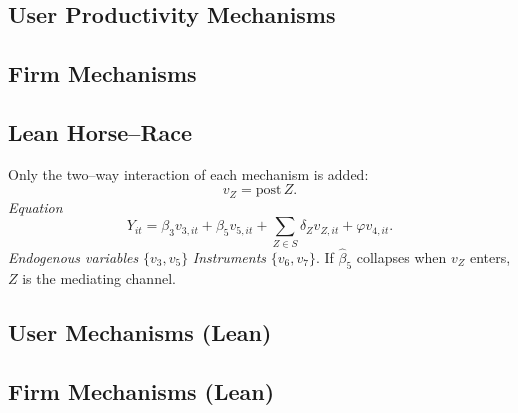 \documentclass{article}
\newcommand{\cleanedresultsdir}{../results/cleaned}
\begin{document}
\clearpage
\begin{landscape}
\subsection{User Productivity Mechanisms}

\end{landscape}

\clearpage
\begin{landscape}
\subsection{Firm Mechanisms}

\end{landscape}


\clearpage
\begin{landscape}
\subsection*{Lean Horse–Race}
Only the two–way interaction of each mechanism is added:
\[v_Z=\text{post}\,Z.\]
\emph{Equation}
\[Y_{it}=\beta_3 v_{3,it}+\beta_5 v_{5,it}+\sum_{Z\in S}\delta_Z v_{Z,it}+\varphi v_{4,it}.
\]
\emph{Endogenous variables}\; $\{v_3,v_5\}$ \quad\emph{Instruments}\; $\{v_6,v_7\}$.
If $\widehat\beta_5$ collapses when $v_Z$ enters, $Z$ is the mediating channel.
\end{landscape}


\clearpage
\begin{landscape}
\subsection{User Mechanisms (Lean)}

\end{landscape}

\clearpage
\begin{landscape}
\subsection{Firm Mechanisms (Lean)}

\end{landscape}
\end{document}
